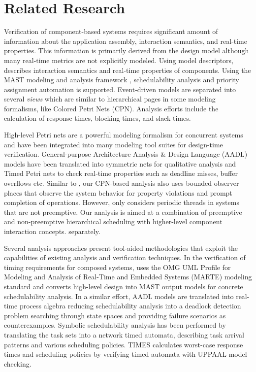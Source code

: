 \section{Related Research}
\label{sec:Related_Research}

Verification of component-based systems requires significant amount of information about the application assembly, interaction semantics, and real-time properties. This information is primarily derived from the design model although many real-time metrics are not explicitly modeled. Using model descriptors, \cite{Lopez2006} describes interaction semantics and real-time properties of components. Using the MAST modeling and analysis framework \cite{MAST1, MAST2}, schedulability analysis and priority assignment automation is supported. Event-driven models are separated into several \emph{views} which are similar to hierarchical pages in some modeling formalisms, like Colored Petri Nets (CPN). Analysis efforts include the calculation of response times, blocking times, and slack times. %

High-level Petri nets are a powerful modeling formalism for concurrent systems and have been integrated into many modeling tool suites for design-time verification. General-purpose Architecture Analysis \& Design Language (AADL) models have been translated into symmetric nets for qualitative analysis \cite{kordon_sn} and Timed Petri nets \cite{kordon2009} to check real-time properties such as deadline misses, buffer overflows etc. Similar to \cite{kordon2009}, our CPN-based analysis also uses bounded observer places \cite{Alpern1989} that observe the system behavior for property violations and prompt completion of operations. However, \cite{kordon2009} only considers periodic threads in systems that are not preemptive. Our analysis is aimed at a combination of preemptive and non-preemptive hierarchical scheduling with higher-level component interaction concepts. separately.

Several analysis approaches present tool-aided methodologies that exploit the capabilities of existing analysis and verification techniques. In the verification of timing requirements for composed systems, \cite{medina2011} uses the OMG UML Profile for Modeling and Analysis of Real-Time and Embedded Systems (MARTE) modeling standard and converts high-level design into MAST output models for concrete schedulability analysis. In a similar effort, AADL models are translated into real-time process algebra \cite{sokolsky2006} reducing schedulability analysis into a deadlock detection problem searching through state spaces and providing failure scenarios as counterexamples. Symbolic schedulability analysis has been performed by translating the task sets into a network timed automata, describing task arrival patterns and various scheduling policies. TIMES \cite{TIMES} calculates worst-case response times and scheduling policies by verifying timed automata with UPPAAL \cite{UPPAAL} model checking.


